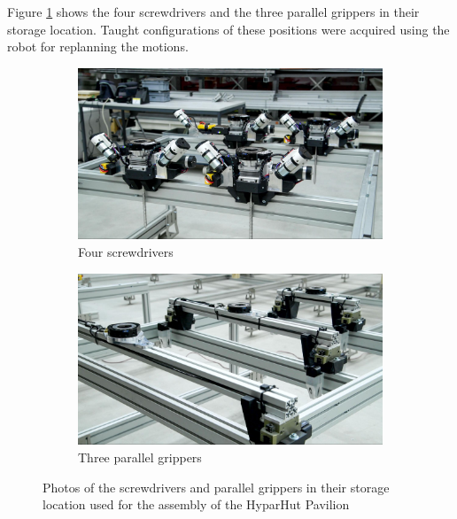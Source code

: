 Figure \ref{fig:photo-tools-hyperhut-pavilion} shows the four screwdrivers and the three parallel grippers in their storage location. Taught configurations of these positions were acquired using the robot for replanning the motions. 

\begin{figure}[!h]
    \centering
    \begin{subfigure}[b]{0.49\textwidth}
        \centering
        \includegraphics[width=\textwidth]{images/7b/img16.jpg}
        \caption{Four screwdrivers}
    \end{subfigure}
    \hfill
    \begin{subfigure}[b]{0.49\textwidth}
        \centering
        \includegraphics[width=\textwidth]{images/7b/img17.jpg}
        \caption{Three parallel grippers}
    \end{subfigure}
    \caption{Photos of the screwdrivers and parallel grippers in their storage location used for the assembly of the HyparHut Pavilion}
    \label{fig:photo-tools-hyperhut-pavilion}
\end{figure}



